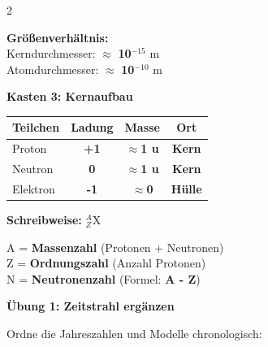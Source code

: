 \documentclass[10pt, a4paper]{article}
\newcommand{\fachfarbe}{physik}
\newcommand{\lsg}[1]{\textcolor{loesung}{\textbf{#1}}}
\newcommand{\abschnitt}[1]{%
    \vspace{8pt}
    \noindent\textbf{\textcolor{\fachfarbe}{#1}}
    \vspace{4pt}
}
\begin{document}
\begin{multicols}{2}
\begin{merksatz}
\vspace{6pt}

\textbf{Größenverhältnis:}\\
Kerndurchmesser: $\approx$ \lsg{10$^{-15}$} m\\
Atomdurchmesser: $\approx$ \lsg{10$^{-10}$} m
\end{merksatz}

\vspace{6pt}


\abschnitt{Kasten 3: Kernaufbau}

\begin{merksatz}
\renewcommand{\arraystretch}{1.4}
\begin{tabular}{|l|c|c|c|}
\hline
\textbf{Teilchen} & \textbf{Ladung} & \textbf{Masse} & \textbf{Ort} \\
\hline
Proton & \lsg{+1} & \lsg{$\approx$1 u} & \lsg{Kern} \\
\hline
Neutron & \lsg{0} & \lsg{$\approx$1 u} & \lsg{Kern} \\
\hline
Elektron & \lsg{-1} & \lsg{$\approx$0} & \lsg{Hülle} \\
\hline
\end{tabular}
\renewcommand{\arraystretch}{1}

\vspace{8pt}

\textbf{Schreibweise:} $^{A}_{Z}$X

\vspace{4pt}

A = \lsg{Massenzahl} (Protonen + Neutronen)\\
Z = \lsg{Ordnungszahl} (Anzahl Protonen)\\
N = \lsg{Neutronenzahl} (Formel: \lsg{A - Z})
\end{merksatz}


\columnbreak


\abschnitt{Übung 1: Zeitstrahl ergänzen}

Ordne die Jahreszahlen und Modelle chronologisch:


\end{multicols}
\end{document}
